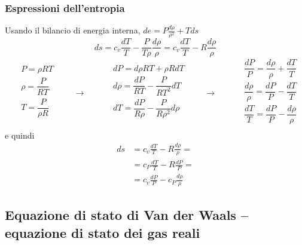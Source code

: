 \subsubsection{Espressioni dell'entropia}
Usando il bilancio di energia interna, $de  = P \frac{d \rho}{\rho^2} + T ds $
\begin{equation}
  ds = c_v \frac{dT}{T} - \frac{P}{T \rho} \frac{d \rho}{\rho} =  c_v \frac{dT}{T} - R \frac{d \rho}{\rho}
\end{equation}
\begin{equation}
\begin{aligned}
    & P = \rho R T \\
    & \rho = \dfrac{P}{RT} \\
    & T = \dfrac{P}{\rho R} \\
\end{aligned} \qquad \rightarrow \qquad
\begin{aligned}
    & dP = d \rho R T + \rho R dT \\
    & d \rho = \dfrac{d P}{R T} - \dfrac{P}{R T^2} dT \\
    & dT = \dfrac{d P}{R \rho} - \dfrac{P}{R \rho^2} d\rho \\
\end{aligned} \qquad \rightarrow \qquad
\begin{aligned}
    & \dfrac{dP}{P} = \dfrac{d \rho}{\rho} + \dfrac{ dT}{T} \\
    & \dfrac{d \rho}{\rho} = \dfrac{d P}{P} - \dfrac{dT}{T} \\
    & \dfrac{dT}{T} = \dfrac{d P}{P} - \dfrac{d\rho}{\rho} \\
\end{aligned}
\end{equation}
e quindi
\begin{equation}\label{eqn:pig-entropy}
\begin{aligned}
  ds & =  c_v \frac{dT}{T} - R \frac{d \rho}{\rho} =  \\
     & =  c_P \frac{dT}{T} - R \frac{d P   }{P   } =  \\
     & =  c_v \frac{dP}{P} - c_P \frac{d \rho}{\rho} 
\end{aligned}
\end{equation}
\subsection{Equazione di stato di Van der Waals -- equazione di stato dei gas reali}

